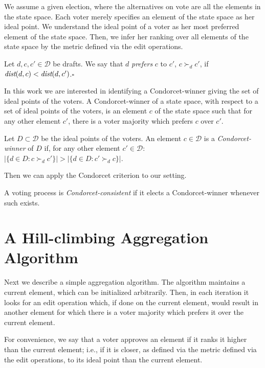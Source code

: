 \documentclass{llncs}
\newcommand{\qqed}{\hfill$\square$}
\newcommand{\calD}{\mathcal{D}}
\newcommand{\prefers}[1]{\succ_{#1}}
\newcommand{\dist}{\emph{dist}}
\begin{document}
We assume a given election, where the alternatives on vote are all the elements in the state space. Each voter merely specifies an element of the state space as her ideal point. We understand the ideal point of a voter as her most preferred element of the state space. Then, we infer her ranking over all elements of the state space by the metric defined via the edit operations.

\begin{definition}[Prefers]\label{lemma:prefers}
%
Let $d, c, c' \in \calD$ be drafts.  We say that  $d$ \emph{prefers}  $c$ to $c'$, $ c \prefers{d} c'$, if $\dist(d, c) < \dist(d, c')$.\qqed
\end{definition}

In this work we are interested in identifying a Condorcet-winner giving the set of ideal points of the voters.
%
A Condorcet-winner of a state space, with respect to a set of ideal points of the voters, is an element $c$ of the state space such that for any other element $c'$, there is a voter majority which prefers $c$ over $c'$.

\begin{definition}\label{lemma:condorcet-winner}
%
Let $D \subset \calD$ be the ideal points of the voters. An element $c \in \calD$ is a \emph{Condorcet-winner} of $D$ if, for any other element $c' \in \calD$:  $|\{ d \in D : c \prefers{d} c' \}| > |\{ d \in D : c' \prefers{d} c \}|$.
%
\end{definition}

Then we can apply the Condorcet criterion to our setting.

\begin{definition}
%
A voting process is \emph{Condorcet-consistent} if it elects a Condorcet-winner whenever such exists.
%
\end{definition}


\section{A Hill-climbing Aggregation Algorithm}

Next we describe a simple aggregation algorithm. 
The algorithm maintains a current element, which can be initialized arbitrarily. Then, in each iteration it looks for an edit operation which, if done on the current element, would result in another element for which there is a voter majority which prefers it over the current element. 

For convenience, we say that a voter approves an element if it ranks it higher than the current element; i.e., if it is closer, as defined via the metric defined via the edit operations, to its ideal point than the current element.
\end{document}
